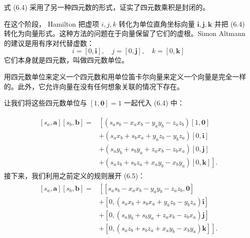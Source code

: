 式 (6.4) 采用了另一种四元数的形式，证实了四元数乘积是封闭的。

在这个阶段， Hamilton 把虚项 $i,j,k$ 转化为单位直角坐标向量 $\mathbf{i}, \mathbf{j}, \mathbf{k}$ 并把 (6.4) 转化为向量形式。这种方法的问题在于向量保留了它们的虚根。Simon Altmann 的建议是用有序对代替虚数：
$$
    i=[0, \mathbf{i}], \quad j=[0, \mathbf{j}], \quad k=[0, \mathbf{k}]
$$
它们本身就是四元数，叫做四元数单位。

用四元数单位来定义一个四元数和用单位笛卡尔向量来定义一个向量是完全一样的。此外，它允许向量在没有任何想象关联的情况下存在。

让我们将这些四元数单位与 $[1, \mathbf{0}]=1$ 一起代入 (6.4) 中：

\begin{align}
    \begin{aligned}
        {\left[s_{a}, \mathbf{a}\right]\left[s_{b}, \mathbf{b}\right]=} & {\left[\left(s_{a} s_{b}-x_{a} x_{b}-y_{a} y_{b}-z_{a} z_{b}\right)[1, \mathbf{0}]\right.}  \\
                                                                        & +\left(s_{a} x_{b}+s_{b} x_{a}+y_{a} z_{b}-y_{b} z_{a}\right)[0, \mathbf{i}]                \\
                                                                        & +\left(s_{a} y_{b}+s_{b} y_{a}+z_{a} x_{b}-z_{b} x_{a}\right)[0, \mathbf{j}]                \\
                                                                        & \left.+\left(s_{a} z_{b}+s_{b} z_{a}+x_{a} y_{b}-x_{b} y_{a}\right)[0, \mathbf{k}]\right] .
    \end{aligned}
\end{align}
接下来，我们利用之前定义的规则展开 (6.5)：
\begin{align}
    \begin{aligned}
        {\left[s_{a}, \mathbf{a}\right]\left[s_{b}, \mathbf{b}\right]=} & {\left[\left[s_{a} s_{b}-x_{a} x_{b}-y_{a} y_{b}-z_{a} z_{b}, \mathbf{0}\right]\right.}                \\
                                                                        & +\left[0,\left(s_{a} x_{b}+s_{b} x_{a}+y_{a} z_{b}-y_{b} z_{a}\right) \mathbf{i}\right]                \\
                                                                        & +\left[0,\left(s_{a} y_{b}+s_{b} y_{a}+z_{a} x_{b}-z_{b} x_{a}\right) \mathbf{j}\right]                \\
                                                                        & \left.+\left[0,\left(s_{a} z_{b}+s_{b} z_{a}+x_{a} y_{b}-x_{b} y_{a}\right) \mathbf{k}\right]\right] .
    \end{aligned}
\end{align}
